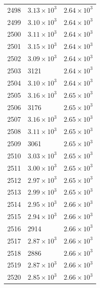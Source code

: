 \begin{table}[H]
\begin{tabular}{lll}
2498 & $\displaystyle 3.13 \times 10^{3}$ & $\displaystyle 2.64 \times 10^{3}$ \\
2499 & $\displaystyle 3.10 \times 10^{3}$ & $\displaystyle 2.64 \times 10^{3}$ \\
2500 & $\displaystyle 3.11 \times 10^{3}$ & $\displaystyle 2.64 \times 10^{3}$ \\
2501 & $\displaystyle 3.15 \times 10^{3}$ & $\displaystyle 2.64 \times 10^{3}$ \\
2502 & $\displaystyle 3.09 \times 10^{3}$ & $\displaystyle 2.64 \times 10^{3}$ \\
2503 & 3121 & $\displaystyle 2.64 \times 10^{3}$ \\
2504 & $\displaystyle 3.10 \times 10^{3}$ & $\displaystyle 2.64 \times 10^{3}$ \\
2505 & $\displaystyle 3.16 \times 10^{3}$ & $\displaystyle 2.65 \times 10^{3}$ \\
2506 & 3176 & $\displaystyle 2.65 \times 10^{3}$ \\
2507 & $\displaystyle 3.16 \times 10^{3}$ & $\displaystyle 2.65 \times 10^{3}$ \\
2508 & $\displaystyle 3.11 \times 10^{3}$ & $\displaystyle 2.65 \times 10^{3}$ \\
2509 & 3061 & $\displaystyle 2.65 \times 10^{3}$ \\
2510 & $\displaystyle 3.03 \times 10^{3}$ & $\displaystyle 2.65 \times 10^{3}$ \\
2511 & $\displaystyle 3.00 \times 10^{3}$ & $\displaystyle 2.65 \times 10^{3}$ \\
2512 & $\displaystyle 2.97 \times 10^{3}$ & $\displaystyle 2.65 \times 10^{3}$ \\
2513 & $\displaystyle 2.99 \times 10^{3}$ & $\displaystyle 2.65 \times 10^{3}$ \\
2514 & $\displaystyle 2.95 \times 10^{3}$ & $\displaystyle 2.66 \times 10^{3}$ \\
2515 & $\displaystyle 2.94 \times 10^{3}$ & $\displaystyle 2.66 \times 10^{3}$ \\
2516 & 2914 & $\displaystyle 2.66 \times 10^{3}$ \\
2517 & $\displaystyle 2.87 \times 10^{3}$ & $\displaystyle 2.66 \times 10^{3}$ \\
2518 & 2886 & $\displaystyle 2.66 \times 10^{3}$ \\
2519 & $\displaystyle 2.87 \times 10^{3}$ & $\displaystyle 2.66 \times 10^{3}$ \\
2520 & $\displaystyle 2.85 \times 10^{3}$ & $\displaystyle 2.66 \times 10^{3}$ \\

\end{tabular}
\end{table}
